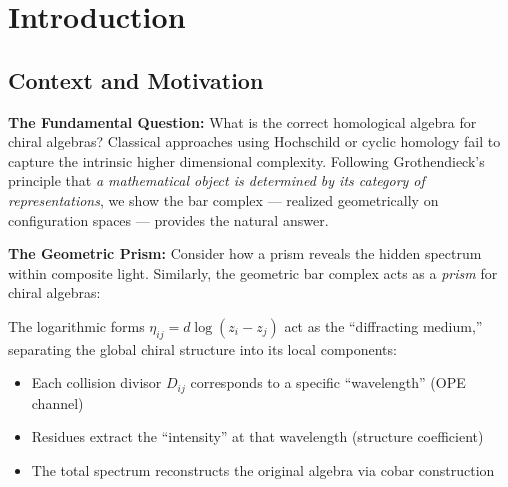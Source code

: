 \section{Introduction}


\subsection{Context and Motivation}


\noindent\textbf{The Fundamental Question:} What is the correct homological algebra for chiral algebras? 
Classical approaches using Hochschild or cyclic homology fail to capture the intrinsic higher dimensional complexity. Following 
Grothendieck's principle that \textit{a mathematical object is determined by its category of representations}, 
we show the bar complex --- realized geometrically on configuration spaces --- provides the natural answer.

\medskip
\noindent\textbf{The Geometric Prism:} Consider how a prism reveals the hidden spectrum within composite light. 
Similarly, the geometric bar complex acts as a \textit{prism} for chiral algebras:

\begin{center}
\end{center}

The logarithmic forms $\eta_{ij} = d\log(z_i - z_j)$ act as the ``diffracting medium,'' separating the 
global chiral structure into its local components:
\begin{itemize}
\item Each collision divisor $D_{ij}$ corresponds to a specific ``wavelength'' (OPE channel)
\item Residues extract the ``intensity'' at that wavelength (structure coefficient)
\item The total spectrum reconstructs the original algebra via cobar construction
\end{itemize}

